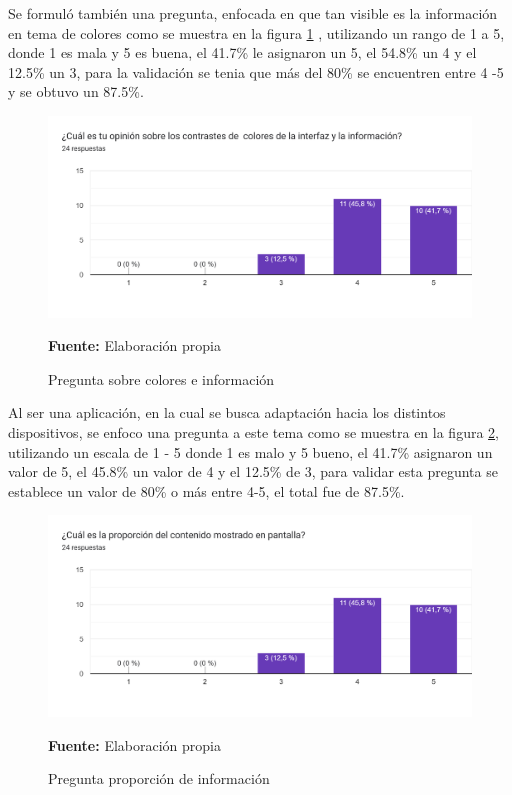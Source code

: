 \documentclass[12pt,twocolumn,a4paper]{article}
\begin{document}
Se formuló también una pregunta, enfocada en que tan visible es la información en tema de colores como se muestra en la figura \ref{Encuesta4} , utilizando un rango de 1 a 5, donde 1 es mala y 5 es buena, el 41.7\% le asignaron un 5, el 54.8\% un 4 y el 12.5\% un 3, para la validación se tenia que más del 80\% se encuentren entre 4 -5 y se obtuvo un 87.5\%.

\begin{figure}[h!]
	\centering
	\includegraphics[scale=0.2]{Encuesta4.png}
	\caption{Pregunta sobre colores e información} \textbf{Fuente:} Elaboración propia 
	\label{Encuesta4}
\end{figure}

Al ser una aplicación, en la cual se busca adaptación hacia los distintos dispositivos, se enfoco una pregunta a este tema como se muestra en la figura \ref{Encuesta5}, utilizando un escala de 1 - 5 donde 1 es malo y 5 bueno, el 41.7\% asignaron un valor de 5, el 45.8\% un valor de 4 y el 12.5\% de 3, para validar esta pregunta se establece  un valor de 80\% o más entre 4-5, el total fue de 87.5\%.

\begin{figure}[h!]
	\centering
	\includegraphics[scale=0.2]{Encuesta5.png}
	\caption{Pregunta proporción de información} \textbf{Fuente:} Elaboración propia 
	\label{Encuesta5}
\end{figure}
\end{document}
